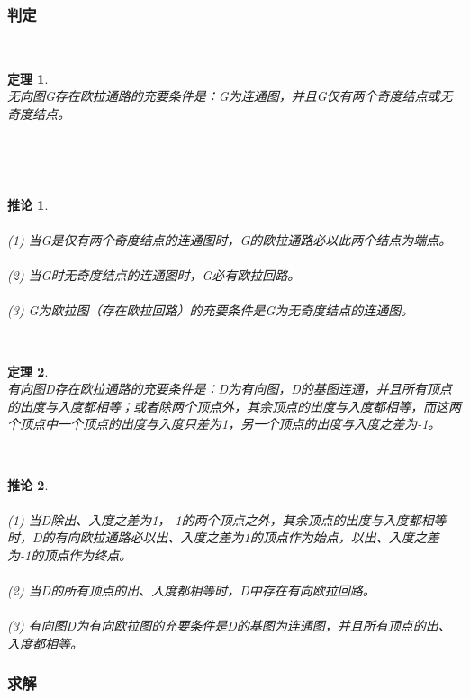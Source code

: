 \documentclass[a4paper]{article}
\begin{document}
\subsubsection{判定}
\newtheorem{theorem}{定理} \\
\begin{theorem} \\
无向图G存在欧拉通路的充要条件是：G为连通图，并且G仅有两个奇度结点或无奇度结点。 \\
\end{theorem} \\
\newtheorem{corollary}{推论} \\
\begin{corollary} \\
 \\
(1) 当G是仅有两个奇度结点的连通图时，G的欧拉通路必以此两个结点为端点。 \\ \\
(2) 当G时无奇度结点的连通图时，G必有欧拉回路。 \\ \\
(3) G为欧拉图（存在欧拉回路）的充要条件是G为无奇度结点的连通图。 \\
\end{corollary} \\
\begin{theorem} \\
有向图D存在欧拉通路的充要条件是：D为有向图，D的基图连通，并且所有顶点的出度与入度都相等；或者除两个顶点外，其余顶点的出度与入度都相等，而这两个顶点中一个顶点的出度与入度只差为1，另一个顶点的出度与入度之差为-1。 \\
\end{theorem} \\
\begin{corollary} \\
 \\
(1) 当D除出、入度之差为1，-1的两个顶点之外，其余顶点的出度与入度都相等时，D的有向欧拉通路必以出、入度之差为1的顶点作为始点，以出、入度之差为-1的顶点作为终点。 \\ \\
(2) 当D的所有顶点的出、入度都相等时，D中存在有向欧拉回路。 \\ \\
(3) 有向图D为有向欧拉图的充要条件是D的基图为连通图，并且所有顶点的出、入度都相等。 \\
\end{corollary}\subsubsection{求解}
\end{document}
